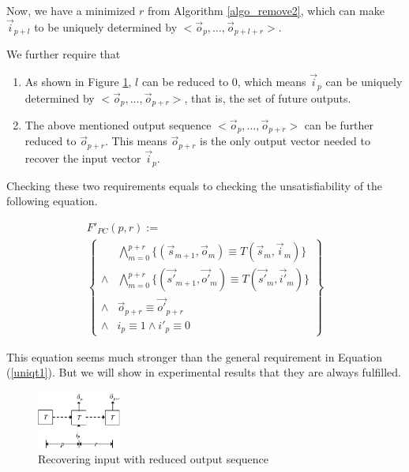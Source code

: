 \documentclass[twocolumn]{article}
\begin{document}
Now, 
we have a minimized $r$ from Algorithm \ref{algo_remove2},
which can make $\vec{i}_{p+l}$ to be uniquely determined by $<\vec{o}_{p},\dots,\vec{o}_{p+l+r}>$.

We further require that 
\begin{enumerate}
 \item As shown in Figure \ref{fig_pc1},
 $l$ can be reduced to 0,
 which means $\vec{i}_{p}$ can be uniquely determined by $<\vec{o}_{p},\dots,\vec{o}_{p+r}>$,
 that is,
 the set of future outputs.
 \item The above mentioned output sequence $<\vec{o}_{p},\dots,\vec{o}_{p+r}>$ 
 can be further reduced to $\vec{o}_{p+r}$.
 This means $\vec{o}_{p+r}$ is the only output vector needed to recover the input vector $\vec{i}_p$.
\end{enumerate}

Checking these two requirements
equals to checking the unsatisfiability of the following equation.

\begin{multline}\label{uniqt11}
F'_{PC}(p,r):=\\
\left\{
\begin{array}{cc}
&\bigwedge_{m=0}^{p+r}
\{
(\vec{s}_{m+1},\vec{o}_m)\equiv T(\vec{s}_m,\vec{i}_m)
\}
\\
\wedge&\bigwedge_{m=0}^{p+r}
\{
(\vec{s'}_{m+1},\vec{o'}_m)\equiv T(\vec{s'}_m,\vec{i'}_m)
\}
\\
\wedge&\vec{o}_{p+r}\equiv \vec{o'}_{p+r} \\
\wedge& i_{p}\equiv 1 \wedge  i'_{p}\equiv 0 
\end{array}
\right\}
\end{multline}


This equation seems much stronger than the general requirement in Equation (\ref{uniqt1}).
But we will show in experimental results that 
they are always fulfilled.

\begin{figure}[t]
\begin{center}
\includegraphics[width=0.25\textwidth]{pc1}
\end{center}
\caption{Recovering input with reduced output sequence}
  \label{fig_pc1}
\end{figure}
\end{document}

